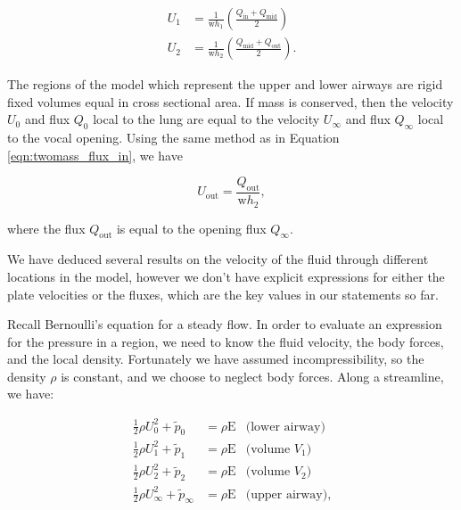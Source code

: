 \documentclass{article}
\begin{document}
\begin{equation}
    \begin{aligned}
        U_1 &= \frac{1}{\mathrm{w}h_1}\left(\frac{Q_\mathrm{in} + Q_\mathrm{mid}}{2}\right) \\
        U_2 &= \frac{1}{\mathrm{w}h_2}\left(\frac{Q_\mathrm{mid} + Q_\mathrm{out}}{2}\right).
        \label{eqn:twomass_velocity_interpolation}
    \end{aligned}
\end{equation}


The regions of the model which represent the upper and lower airways are rigid fixed volumes equal in cross sectional area.
If mass is conserved, then the velocity $U_0$ and flux $Q_0$ local to the lung are equal to the velocity $U_\infty$ and flux $Q_\infty$ local to the vocal opening.
Using the same method as in Equation \ref{eqn:twomass_flux_in}, we have

\begin{equation}
    U_\mathrm{out} = \frac{Q_\mathrm{out}}{\mathrm{w}h_2},
    \label{eqn:twomass_flux_out}
\end{equation}


where the flux $Q_\mathrm{out}$ is equal to the opening flux $Q_\mathrm{\infty}$.

We have deduced several results on the velocity of the fluid through different locations in the model,
however we don't have explicit expressions for either the plate velocities or the fluxes,
which are the key values in our statements so far.

Recall Bernoulli's equation for a steady flow.
In order to evaluate an expression for the pressure in a region,
we need to know the fluid velocity, the body forces, and the local density.
Fortunately we have assumed incompressibility, so the density $\rho$ is constant,
and we choose to neglect body forces.
Along a streamline, we have:

\begin{equation}
    \begin{aligned}
        \frac{1}{2}\rho U_0^2 + \tilde{p}_0 &= \rho\mathrm{E} &\text{(lower airway)}\\
        \frac{1}{2}\rho U_1^2 + \tilde{p}_1 &= \rho\mathrm{E} &\text{(volume $V_1$)}  \\
        \frac{1}{2}\rho U_2^2 + \tilde{p}_2 &= \rho\mathrm{E} &\text{(volume $V_2$)}  \\
        \frac{1}{2}\rho U_\infty^2 + \tilde{p}_\infty &= \rho\mathrm{E} &\text{(upper airway)},
    \end{aligned}
\end{equation}
\end{document}
